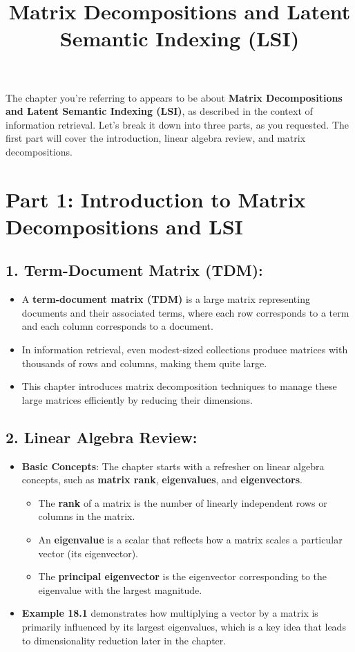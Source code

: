 \documentclass{article}
\title{Matrix Decompositions and Latent Semantic Indexing (LSI)}
\begin{document}
\maketitle

The chapter you're referring to appears to be about \textbf{Matrix Decompositions and Latent Semantic Indexing (LSI)}, as described in the context of information retrieval. Let's break it down into three parts, as you requested. The first part will cover the introduction, linear algebra review, and matrix decompositions.

\section*{Part 1: Introduction to Matrix Decompositions and LSI}

\subsection*{1. Term-Document Matrix (TDM):}
\begin{itemize}
    \item A \textbf{term-document matrix (TDM)} is a large matrix representing documents and their associated terms, where each row corresponds to a term and each column corresponds to a document.
    \item In information retrieval, even modest-sized collections produce matrices with thousands of rows and columns, making them quite large.
    \item This chapter introduces matrix decomposition techniques to manage these large matrices efficiently by reducing their dimensions.
\end{itemize}

\subsection*{2. Linear Algebra Review:}
\begin{itemize}
    \item \textbf{Basic Concepts}: The chapter starts with a refresher on linear algebra concepts, such as \textbf{matrix rank}, \textbf{eigenvalues}, and \textbf{eigenvectors}.
    \begin{itemize}
        \item The \textbf{rank} of a matrix is the number of linearly independent rows or columns in the matrix.
        \item An \textbf{eigenvalue} is a scalar that reflects how a matrix scales a particular vector (its eigenvector).
        \item The \textbf{principal eigenvector} is the eigenvector corresponding to the eigenvalue with the largest magnitude.
    \end{itemize}
    \item \textbf{Example 18.1} demonstrates how multiplying a vector by a matrix is primarily influenced by its largest eigenvalues, which is a key idea that leads to dimensionality reduction later in the chapter.
\end{itemize}
\end{document}
